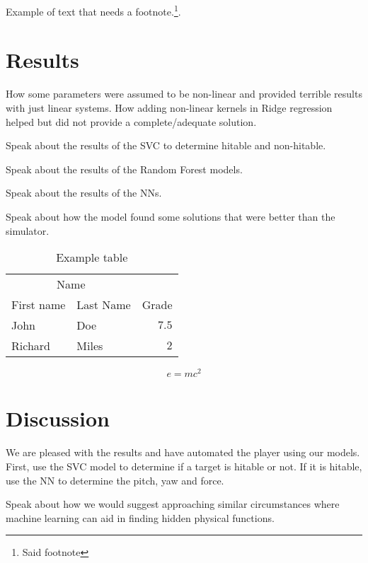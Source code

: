 \documentclass[twoside,twocolumn]{article}
\begin{document}
Example of text that needs a footnote.\footnote{Said footnote}.


\section{Results}
How some parameters were assumed to be non-linear and provided terrible results with just linear systems.
How adding non-linear kernels in Ridge regression helped but did not provide a complete/adequate solution.

Speak about the results of the SVC to determine hitable and non-hitable.

Speak about the results of the Random Forest models.

Speak about the results of the NNs.

Speak about how the model found some solutions that were better than the simulator.

\begin{table}
\caption{Example table}
\centering
\begin{tabular}{llr}
\toprule
\multicolumn{2}{c}{Name} \\
\cmidrule(r){1-2}
First name & Last Name & Grade \\
\midrule
John & Doe & $7.5$ \\
Richard & Miles & $2$ \\
\bottomrule
\end{tabular}
\end{table}

\blindtext %

\begin{equation}
\label{eq:emc}
e = mc^2
\end{equation}

\blindtext %


\section{Discussion}

We are pleased with the results and have automated the player using our models.
First, use the SVC model to determine if a target is hitable or not. If it is hitable, use the NN to determine the pitch, yaw and force.

Speak about how we would suggest approaching similar circumstances where machine learning can aid in finding hidden physical functions.
\end{document}
